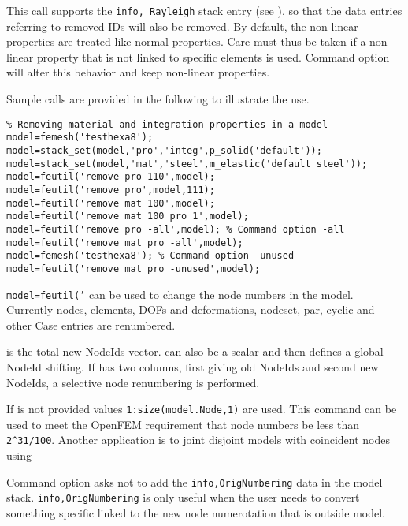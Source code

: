 \begin{SDT}
This call supports the {\tt info, Rayleigh} stack entry (see ), so that the data entries referring to removed IDs will also be removed.
By default, the non-linear properties are treated like normal properties. Care must thus be taken if a non-linear property that is not linked to specific elements is used. Command option~ will alter this behavior and keep non-linear properties.
\end{SDT}

Sample calls are provided in the following to illustrate the use.
\begin{verbatim}
% Removing material and integration properties in a model
model=femesh('testhexa8');
model=stack_set(model,'pro','integ',p_solid('default'));
model=stack_set(model,'mat','steel',m_elastic('default steel'));
model=feutil('remove pro 110',model);
model=feutil('remove pro',model,111);
model=feutil('remove mat 100',model);
model=feutil('remove mat 100 pro 1',model);
model=feutil('remove pro -all',model); % Command option -all
model=feutil('remove mat pro -all',model);
model=femesh('testhexa8'); % Command option -unused
model=feutil('remove mat pro -unused',model);
\end{verbatim}%


{\tt model=feutil('} can be used to change the node numbers in the model. Currently nodes, elements, DOFs and deformations, nodeset, par, cyclic and other Case entries are renumbered.

 is the total new NodeIds vector.  can also be a scalar and then defines a global NodeId shifting. If  has two columns, first giving old NodeIds and second new NodeIds, a selective node renumbering is performed.

If  is not provided values {\tt 1:size(model.Node,1)} are used.  This command can be used to meet the OpenFEM requirement that node numbers be less than {\tt 2\verb+^+31/100}. Another application is to joint disjoint models with coincident nodes using

Command option  asks not to add the {\tt info,OrigNumbering} data in the model stack. {\tt info,OrigNumbering} is only useful when the user needs to convert something specific linked to the new node numerotation that is outside model.

